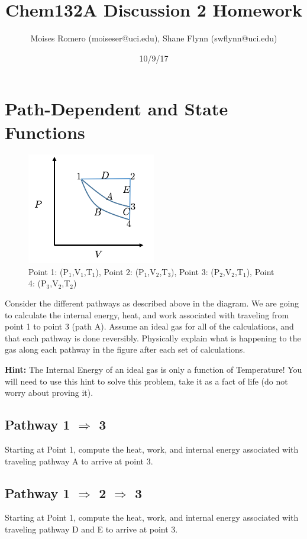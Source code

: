 \documentclass{article}
\title{Chem132A Discussion 2 Homework}
\author{Moises Romero (moiseser@uci.edu), Shane Flynn (swflynn@uci.edu) }
\date{10/9/17}
\begin{document}
\maketitle

\section{Path-Dependent and State Functions}
\begin{figure}[h]
\caption{Point 1: (P$_1$,V$_1$,T$_1$), Point 2: (P$_1$,V$_2$,T$_3$), Point 3: (P$_2$,V$_2$,T$_1$), Point 4: (P$_3$,V$_2$,T$_2$)}
\includegraphics[width=0.5\textwidth]{cycle.png}
\end{figure}
Consider the different pathways as described above in the diagram. 
We are going to calculate the internal energy, heat, and work associated with traveling from point 1 to point 3 (path A). 
Assume an ideal gas for all of the calculations, and that each pathway is done reversibly. 
Physically explain what is happening to the gas along each pathway in the figure after each set of calculations. 

\textbf{Hint:} The Internal Energy of an ideal gas is only a function of Temperature! 
You will need to use this hint to solve this problem, take it as a fact of life (do not worry about proving it). 

\subsection{Pathway 1 $\Rightarrow$ 3}
Starting at Point 1, compute the heat, work, and internal energy associated with traveling pathway A to arrive at point 3.

\subsection{Pathway 1 $\Rightarrow$ 2 $\Rightarrow$ 3}
Starting at Point 1, compute the heat, work, and internal energy associated with traveling pathway D and E to arrive at point 3.
 
\end{document}
